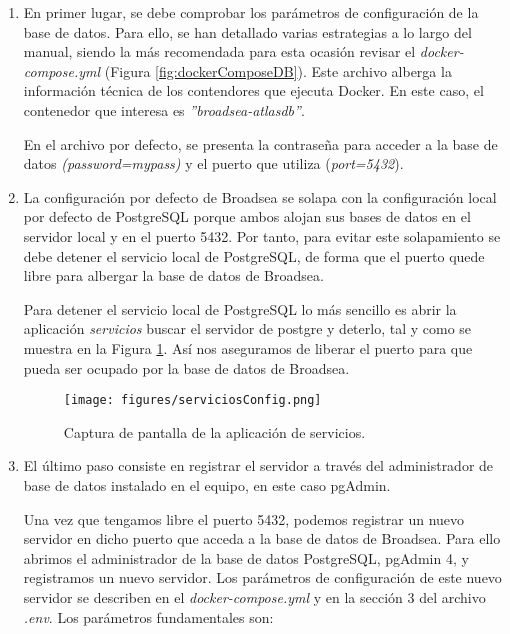 \begin{enumerate}

    \item En primer lugar, se debe comprobar los parámetros de configuración de la base de datos. Para ello, se han detallado varias estrategias a lo largo del manual, siendo la más recomendada para esta ocasión revisar el \textit{docker-compose.yml} (Figura \ref{fig:dockerComposeDB}). Este archivo alberga la información técnica de los contendores que ejecuta Docker. En este caso, el contenedor que interesa es \textit{''broadsea-atlasdb''}.

    En el archivo por defecto, se presenta la contraseña para acceder a la base de datos \textit{(password=mypass)} y el puerto que utiliza (\textit{port=5432}).

    \item La configuración por defecto de Broadsea se solapa con la configuración local por defecto de PostgreSQL porque ambos alojan sus bases de datos en el servidor local y en el puerto 5432. Por tanto, para evitar este solapamiento se debe detener el servicio local de PostgreSQL, de forma que el puerto quede libre para albergar la base de datos de Broadsea.

    Para detener el servicio local de PostgreSQL lo más sencillo es abrir la aplicación \textit{servicios} buscar el servidor de postgre y deterlo, tal y como se muestra en la Figura \ref{fig:serviciosConfig}. Así nos aseguramos de liberar el puerto para que pueda ser ocupado por la base de datos de Broadsea.

    \begin{figure}[H]
    \centering
    \texttt{[image: figures/serviciosConfig.png]}
     \caption{Captura de pantalla de la aplicación de servicios.}
    \label{fig:serviciosConfig}
    \end{figure}

    \item El último paso consiste en registrar el servidor a través del administrador de base de datos instalado en el equipo, en este caso pgAdmin. 
    
    Una vez que tengamos libre el puerto 5432, podemos registrar un nuevo servidor en dicho puerto que acceda a la base de datos de Broadsea. Para ello abrimos el administrador de la base de datos PostgreSQL, pgAdmin 4, y registramos un nuevo servidor. Los parámetros de configuración de este nuevo servidor se describen en el \textit{docker-compose.yml} y en la sección 3 del archivo \textit{.env}. Los parámetros fundamentales son:


\end{enumerate}
